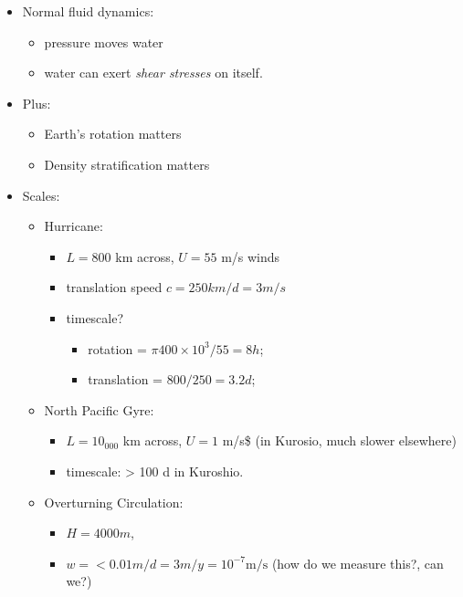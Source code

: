 \begin{itemize}
\tightlist
\item
  Normal fluid dynamics:

  \begin{itemize}
  \tightlist
  \item
    pressure moves water
  \item
    water can exert \emph{shear stresses} on itself.
  \end{itemize}
\item
  Plus:

  \begin{itemize}
  \tightlist
  \item
    Earth's rotation matters
  \item
    Density stratification matters
  \end{itemize}
\item
  Scales:

  \begin{itemize}
  \tightlist
  \item
    Hurricane:

    \begin{itemize}
    \tightlist
    \item
      \(L = 800\) km across, \(U = 55\) m/s winds
    \item
      translation speed \(c= 250 km/ d = 3 m/s\)
    \item
      timescale?

      \begin{itemize}
      \tightlist
      \item
        rotation = \(\pi 400\times10^3 / 55 = 8 h\);
      \item
        translation = \(800 /250 = 3.2 d\);
      \end{itemize}
    \end{itemize}
  \item
    North Pacific Gyre:

    \begin{itemize}
    \tightlist
    \item
      \(L = 10_000\) km across, \(U = 1\) m/s\$ (in Kurosio, much slower
      elsewhere)
    \item
      timescale: \textgreater{} 100 d in Kuroshio.
    \end{itemize}
  \item
    Overturning Circulation:

    \begin{itemize}
    \tightlist
    \item
      \(H = 4000 m\),
    \item
      \(w = <0.01 m/d = 3 m /y = 10^{-7} \mathrm{m/s}\) (how do we
      measure this?, can we?)


\end{itemize}
\end{itemize}
\end{itemize}
